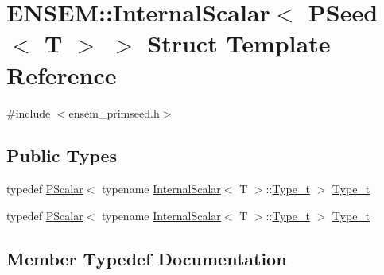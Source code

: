 \hypertarget{structENSEM_1_1InternalScalar_3_01PSeed_3_01T_01_4_01_4}{}\section{E\+N\+S\+EM\+:\+:Internal\+Scalar$<$ P\+Seed$<$ T $>$ $>$ Struct Template Reference}
\label{structENSEM_1_1InternalScalar_3_01PSeed_3_01T_01_4_01_4}


{\ttfamily \#include $<$ensem\+\_\+primseed.\+h$>$}

\subsection*{Public Types}
\begin{DoxyCompactItemize}
\item 
typedef \mbox{\hyperlink{classENSEM_1_1PScalar}{P\+Scalar}}$<$ typename \mbox{\hyperlink{structENSEM_1_1InternalScalar}{Internal\+Scalar}}$<$ T $>$\+::\mbox{\hyperlink{structENSEM_1_1InternalScalar_3_01PSeed_3_01T_01_4_01_4_af1fc242826d3ea17d7b76fd281a82eba}{Type\+\_\+t}} $>$ \mbox{\hyperlink{structENSEM_1_1InternalScalar_3_01PSeed_3_01T_01_4_01_4_af1fc242826d3ea17d7b76fd281a82eba}{Type\+\_\+t}}
\item 
typedef \mbox{\hyperlink{classENSEM_1_1PScalar}{P\+Scalar}}$<$ typename \mbox{\hyperlink{structENSEM_1_1InternalScalar}{Internal\+Scalar}}$<$ T $>$\+::\mbox{\hyperlink{structENSEM_1_1InternalScalar_3_01PSeed_3_01T_01_4_01_4_af1fc242826d3ea17d7b76fd281a82eba}{Type\+\_\+t}} $>$ \mbox{\hyperlink{structENSEM_1_1InternalScalar_3_01PSeed_3_01T_01_4_01_4_af1fc242826d3ea17d7b76fd281a82eba}{Type\+\_\+t}}
\end{DoxyCompactItemize}


\subsection{Member Typedef Documentation}
\mbox{\label{structENSEM_1_1InternalScalar_3_01PSeed_3_01T_01_4_01_4_af1fc242826d3ea17d7b76fd281a82eba}} 
